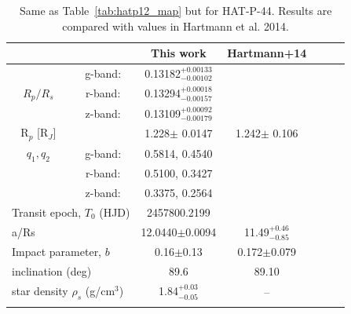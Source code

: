 \begin{table}
\centering
\caption{Same as Table~\ref{tab:hatp12_map} but for HAT-P-44. Results are compared with values in Hartmann et al. 2014.}
\begin{tabular}{ccccccc}
\multicolumn{2}{l}{}                     & This work                    & Hartmann+14 \\ \hline
\multirow{3}{*}{$R_p/R_s$}& g-band:      & 0.13182$_{-0.00102}^{+0.00133}$        &  \\
                          & r-band:      & 0.13294$_{-0.00157}^{+0.00018}$        &  \\
                          & z-band:      & 0.13109$_{-0.00179}^{+0.00092}$        &  \\ \hline
R$_p$ [R$_J$]             & & 1.228$\pm$ 0.0147 & 1.242$\pm$ 0.106 \\
$q_1, q_2$                & g-band:      & 0.5814, 0.4540 &  \\
                          & r-band:      & 0.5100, 0.3427 &  \\
                          & z-band:      & 0.3375, 0.2564 &  \\ \hline
\multicolumn{2}{l}{Transit epoch, $T_0$ (HJD)} & 2457800.2199   &  \\
\multicolumn{2}{l}{a/Rs}                   & 12.0440$\pm$0.0094 &  11.49$^{+0.46}_{-0.85}$ \\
\multicolumn{2}{l}{Impact parameter, $b$}  & 0.16$\pm$0.13  &  0.172$\pm$0.079 \\
\multicolumn{2}{l}{inclination (deg)}      & 89.6           &  89.10 \\ 
\multicolumn{2}{l}{star density $\rho_s$ (g/cm$^3$)}        & 1.84$_{-0.05}^{+0.03}$  &  --  \\  
\hline  
\label{tab:hatp44_map}
\end{tabular}
\end{table}

